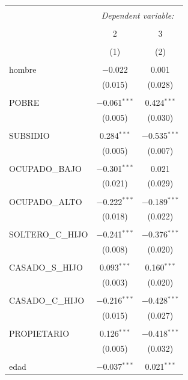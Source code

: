 \documentclass[12pt,a4paper]{article}
\begin{document}
\begin{table}[!htbp] \centering \scriptsize
  \caption{} 
  \label{} 
\begin{tabular}{@{\extracolsep{5pt}}lcc} 
\\[-1.8ex]\hline 
\hline \\[-1.8ex] 
 & \multicolumn{2}{c}{\textit{Dependent variable:}} \\ 
\cline{2-3} 
\\[-1.8ex] & 2 & 3 \\ 
\\[-1.8ex] & (1) & (2)\\ 
\hline \\[-1.8ex] 
 hombre & $-$0.022 & 0.001 \\ 
  & (0.015) & (0.028) \\ 
  & & \\ 
 POBRE & $-$0.061$^{***}$ & 0.424$^{***}$ \\ 
  & (0.005) & (0.030) \\ 
  & & \\ 
 SUBSIDIO & 0.284$^{***}$ & $-$0.535$^{***}$ \\ 
  & (0.005) & (0.007) \\ 
  & & \\ 
 OCUPADO\_BAJO & $-$0.301$^{***}$ & 0.021 \\ 
  & (0.021) & (0.029) \\ 
  & & \\ 
 OCUPADO\_ALTO & $-$0.222$^{***}$ & $-$0.189$^{***}$ \\ 
  & (0.018) & (0.022) \\ 
  & & \\ 
 SOLTERO\_C\_HIJO & $-$0.241$^{***}$ & $-$0.376$^{***}$ \\ 
  & (0.008) & (0.020) \\ 
  & & \\ 
 CASADO\_S\_HIJO & 0.093$^{***}$ & 0.160$^{***}$ \\ 
  & (0.003) & (0.020) \\ 
  & & \\ 
 CASADO\_C\_HIJO & $-$0.216$^{***}$ & $-$0.428$^{***}$ \\ 
  & (0.015) & (0.027) \\ 
  & & \\ 
 PROPIETARIO & 0.126$^{***}$ & $-$0.418$^{***}$ \\ 
  & (0.005) & (0.032) \\ 
  & & \\ 
 edad & $-$0.037$^{***}$ & 0.021$^{***}$ \\ 

\end{tabular}
\end{table}
\end{document}
